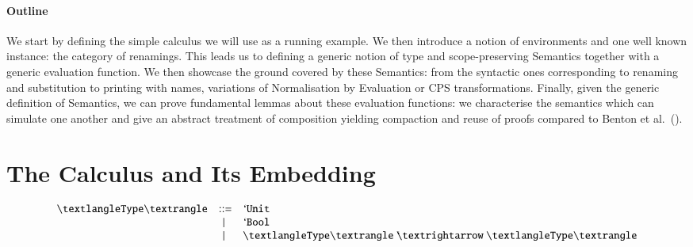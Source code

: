 \paragraph{Outline} We start by defining the simple calculus we will
use as a running example. We then introduce a notion of environments
and one well known instance: the category of renamings. This leads us
to defining a generic notion of type and scope-preserving Semantics
together with a generic evaluation function. We then showcase the
ground covered by these Semantics: from the syntactic ones
corresponding to renaming and substitution to printing with names,
variations of Normalisation by Evaluation or CPS transformations.
Finally, given the generic
definition of Semantics, we can prove fundamental lemmas about these
evaluation functions: we characterise the semantics which can simulate
one another and give an abstract treatment of composition yielding
compaction and reuse of proofs compared to Benton et
al.~(\citeyear{benton2012strongly}).

\section{The Calculus and Its Embedding}


\[
\begin{array}{lcl}
⟨\type{}⟩ & ::=    & \unit{} \\
          & \mid{} & \bool{} \\
          & \mid{} & \arrow{⟨\type{}⟩}{⟨\type{}⟩}
\end{array}
\]
